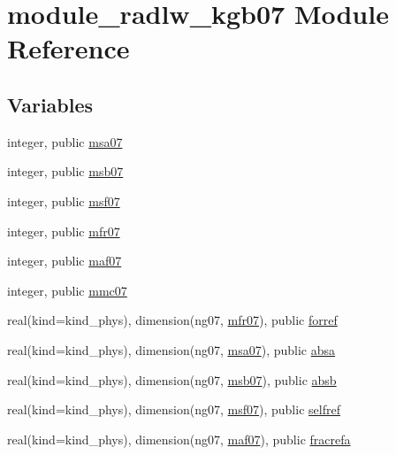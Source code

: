 \hypertarget{namespacemodule__radlw__kgb07}{}\section{module\+\_\+radlw\+\_\+kgb07 Module Reference}
\label{namespacemodule__radlw__kgb07}
\subsection*{Variables}
\begin{DoxyCompactItemize}
\item 
integer, public \hyperlink{namespacemodule__radlw__kgb07_a0acb84a6b261fc00f1765707844c32f2}{msa07}
\item 
integer, public \hyperlink{group__module__radlw__main_gabba2139dfc5d8551f844f3809c28ce3c}{msb07}
\item 
integer, public \hyperlink{group__module__radlw__main_ga9310f33501467fbadcf092d71559358b}{msf07}
\item 
integer, public \hyperlink{group__module__radlw__main_ga0bd5d550553238ae13cbf57423d102c8}{mfr07}
\item 
integer, public \hyperlink{group__module__radlw__main_ga21ac454fe21fb07ee555b4106121b2ae}{maf07}
\item 
integer, public \hyperlink{group__module__radlw__main_ga2d176bec938d9fdcc2369fda91308702}{mmc07}
\item 
real(kind=kind\+\_\+phys), dimension(ng07, \hyperlink{group__module__radlw__main_ga0bd5d550553238ae13cbf57423d102c8}{mfr07}), public \hyperlink{group__module__radlw__main_ga43ceef4cb2707a2874c2d59e93ba9791}{forref}
\item 
real(kind=kind\+\_\+phys), dimension(ng07, \hyperlink{namespacemodule__radlw__kgb07_a0acb84a6b261fc00f1765707844c32f2}{msa07}), public \hyperlink{group__module__radlw__main_gaf106cf054f7496a092ceb0c399753a36}{absa}
\item 
real(kind=kind\+\_\+phys), dimension(ng07, \hyperlink{group__module__radlw__main_gabba2139dfc5d8551f844f3809c28ce3c}{msb07}), public \hyperlink{group__module__radlw__main_gab0478438e9bbe64401aa492510f8d4bb}{absb}
\item 
real(kind=kind\+\_\+phys), dimension(ng07, \hyperlink{group__module__radlw__main_ga9310f33501467fbadcf092d71559358b}{msf07}), public \hyperlink{group__module__radlw__main_gaaf6d41f390a0465af92756b9c3e6c558}{selfref}
\item 
real(kind=kind\+\_\+phys), dimension(ng07, \hyperlink{group__module__radlw__main_ga21ac454fe21fb07ee555b4106121b2ae}{maf07}), public \hyperlink{group__module__radlw__main_ga07f2a4a0f1152a65aed68623f14a9ae4}{fracrefa}

\end{DoxyCompactItemize}
